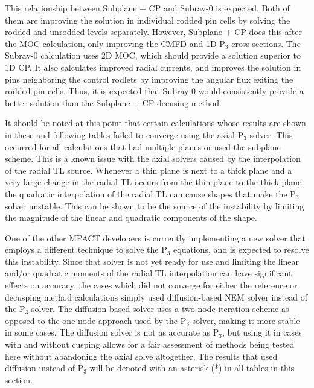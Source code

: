 This relationship between Subplane + CP and Subray-0 is expected.  Both of them are improving the solution in individual rodded pin cells by solving the rodded and unrodded levels separately.  However, Subplane + CP does this after the MOC calculation, only improving the CMFD and 1D P$_3$ cross sections.  The Subray-0 calculation uses 2D MOC, which should provide a solution superior to 1D CP.  It also calculates improved radial currents, and improves the solution in pins neighboring the control rodlets by improving the angular flux exiting the rodded pin cells.  Thus, it is expected that Subray-0 would consistently provide a better solution than the Subplane + CP decusing method.

It should be noted at this point that certain calculations whose results are shown in these and following tables failed to converge using the axial P$_3$ solver.  This occurred for all calculations that had multiple planes or used the subplane scheme.  This is a known issue with the axial solvers caused by the interpolation of the radial TL source.  Whenever a thin plane is next to a thick plane and a very large change in the radial TL occurs from the thin plane to the thick plane, the quadratic interpolation of the radial TL can cause shapes that make the P$_3$ solver unstable.  This can be shown to be the source of the instability by limiting the magnitude of the linear and quadratic components of the shape.

One of the other MPACT developers is currently implementing a new solver that employs a different technique to solve the P$_3$ equations, and is expected to resolve this instability.  Since that solver is not yet ready for use and limiting the linear and/or quadratic moments of the radial TL interpolation can have significant effects on accuracy, the cases which did not converge for either the reference or decusping method calculations simply used diffusion-based NEM solver instead of the P$_3$ solver.  The diffusion-based solver uses a two-node iteration scheme as opposed to the one-node approach used by the P$_3$ solver, making it more stable in some cases.  The diffusion solver is not as accurate as P$_3$, but using it in cases with and without cusping allows for a fair assessment of methods being tested here without abandoning the axial solve altogether.  The results that used diffusion instead of P$_3$ will be denoted with an asterisk (*) in all tables in this section.

